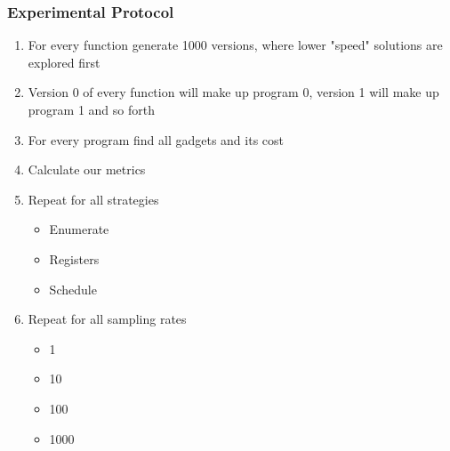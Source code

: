 \begin{frame}
	\frametitle{Experimental Protocol}

	\begin{enumerate}
		\item For every function generate 1000 versions, where lower "speed" solutions are explored first
		\item Version 0 of every function will make up program 0, version 1 will make up program
			1 and so forth
		\item For every program find all gadgets and its cost
		\item Calculate our metrics
		\item Repeat for all strategies
			\begin{itemize}
				\item Enumerate
				\item Registers
				\item Schedule
			\end{itemize}
		\item Repeat for all sampling rates
			\begin{itemize}
				\item 1
				\item 10
				\item 100
				\item 1000
			\end{itemize}
	\end{enumerate}

\end{frame}
